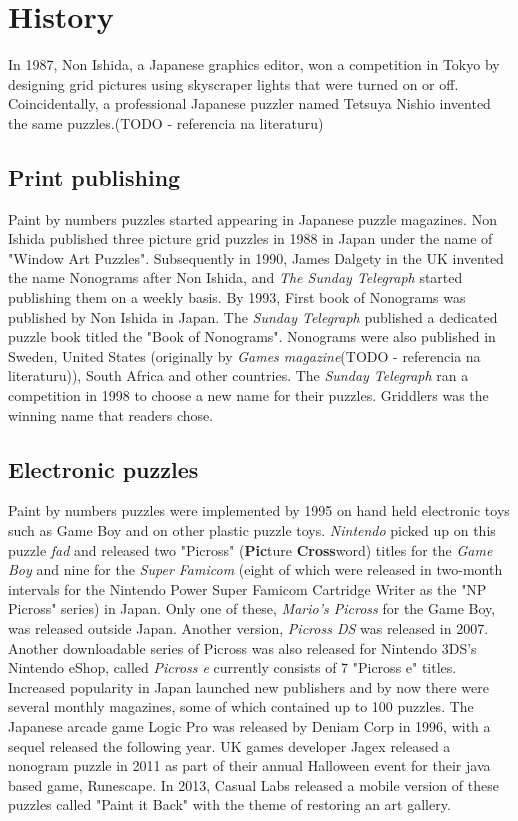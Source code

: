 \chapter{History}
In 1987, Non Ishida, a Japanese graphics editor, won a competition in Tokyo by designing grid pictures using skyscraper lights that were turned on or off. Coincidentally, a professional Japanese puzzler named Tetsuya Nishio invented the same puzzles.(TODO - referencia na literaturu)


\section{Print publishing}
Paint by numbers puzzles started appearing in Japanese puzzle magazines. Non Ishida published three picture grid puzzles in 1988 in Japan under the name of "Window Art Puzzles". Subsequently in 1990, James Dalgety in the UK invented the name Nonograms after Non Ishida, and \textit{\textit{The Sunday Telegraph}} started publishing them on a weekly basis. By 1993, First book of Nonograms was published by Non Ishida in Japan. The \textit{Sunday Telegraph} published a dedicated puzzle book titled the "Book of Nonograms". Nonograms were also published in Sweden, United States (originally by \textit{\textit{Games} magazine}(TODO - referencia na literaturu)), South Africa and other countries. The \textit{Sunday Telegraph} ran a competition in 1998 to choose a new name for their puzzles. Griddlers was the winning name that readers chose.


\section{Electronic puzzles}
Paint by numbers puzzles were implemented by 1995 on hand held electronic toys such as Game Boy and on other plastic puzzle toys. \textit{Nintendo} picked up on this puzzle \textit{fad} and released two "Picross" (\textbf{Pic}ture \textbf{Cross}word) titles for the \textit{Game Boy} and nine for the \textit{Super Famicom} (eight of which were released in two-month intervals for the Nintendo Power Super Famicom Cartridge Writer as the "NP Picross" series) in Japan. Only one of these, \textit{\textit{Mario's Picross}} for the Game Boy, was released outside Japan. Another version, \textit{Picross DS} was released in 2007. Another downloadable series of Picross was also released for Nintendo 3DS's Nintendo eShop, called \textit{Picross e} currently consists of 7 "Picross e" titles.  Increased popularity in Japan launched new publishers and by now there were several monthly magazines, some of which contained up to 100 puzzles. The Japanese arcade game Logic Pro was released by Deniam Corp in 1996, with a sequel released the following year. UK games developer Jagex released a nonogram puzzle in 2011 as part of their annual Halloween event for their java based game, Runescape. In 2013, Casual Labs released a mobile version of these puzzles called "Paint it Back" with the theme of restoring an art gallery.


